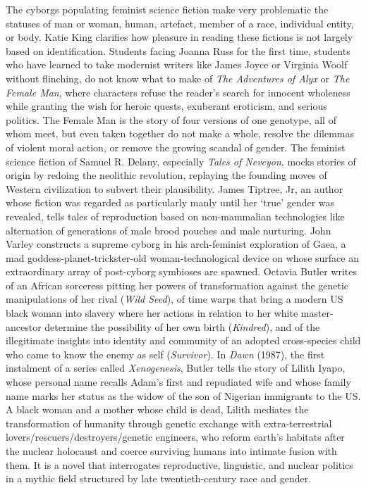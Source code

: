 \documentclass[DIV=12,%
               BCOR=10mm,%
               headinclude=false,%
               footinclude=false,open=any,%
               fontsize=11pt,%
               twoside,%
               paper=210mm:11in]%
               {scrbook}
\newcommand*{\Slash}{\slash\hspace{0pt}}
\begin{document}
The cyborgs populating feminist science fiction make very problematic the statuses of man or woman, human, artefact, member of a race, individual entity, or body. Katie King clarifies how pleasure in reading these fictions is not largely based on identification. Students facing Joanna Russ for the first time, students who have learned to take modernist writers like James Joyce or Virginia Woolf without flinching, do not know what to make of \emph{The Adventures of Alyx} or \emph{The Female Man}, where characters refuse the reader’s search for innocent wholeness while granting the wish for heroic quests, exuberant eroticism, and serious politics. The Female Man is the story of four versions of one genotype, all of whom meet, but even taken together do not make a whole, resolve the dilemmas of violent moral action, or remove the growing scandal of gender. The feminist science fiction of Samuel R. Delany, especially \emph{Tales of Neveyon}, mocks stories of origin by redoing the neolithic revolution, replaying the founding moves of Western civilization to subvert their plausibility. James Tiptree, Jr, an author whose fiction was regarded as particularly manly until her ‘true’ gender was revealed, tells tales of reproduction based on non-mammalian technologies like alternation of generations of male brood pouches and male nurturing. John Varley constructs a supreme cyborg in his arch-feminist exploration of Gaea, a mad goddess-planet-trickster-old woman-technological device on whose surface an extraordinary array of post-cyborg symbioses are spawned. Octavia Butler writes of an African sorceress pitting her powers of transformation against the genetic manipulations of her rival (\emph{Wild Seed}), of time warps that bring a modern US black woman into slavery where her actions in relation to her white master-ancestor determine the possibility of her own birth (\emph{Kindred}), and of the illegitimate insights into identity and community of an adopted cross-species child who came to know the enemy as self (\emph{Survivor}). In \emph{Dawn} (1987), the first instalment of a series called \emph{Xenogenesis}, Butler tells the story of Lilith Iyapo, whose personal name recalls Adam’s first and repudiated wife and whose family name marks her status as the widow of the son of Nigerian immigrants to the US. A black woman and a mother whose child is dead, Lilith mediates the transformation of humanity through genetic exchange with extra-terrestrial lovers\Slash{}rescuers\Slash{}destroyers\Slash{}genetic engineers, who reform earth’s habitats after the nuclear holocaust and coerce surviving humans into intimate fusion with them. It is a novel that interrogates reproductive, linguistic, and nuclear politics in a mythic field structured by late twentieth-century race and gender.
\end{document}
